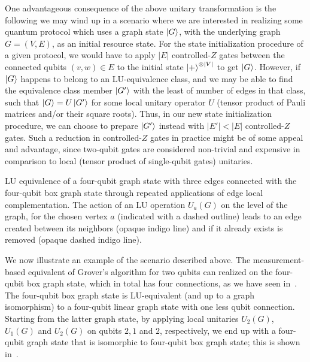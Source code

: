 \bigskip
\noindent
One advantageous consequence of the above unitary transformation is the following we may wind up in a scenario where we are interested in realizing some quantum protocol which uses a graph state $\ket{G}$, with the underlying graph $G=(V,E)$, as an initial resource state. For the state initialization procedure of a given protocol, we would have to apply $|E|$ controlled-$Z$ gates between the connected qubits $(v,w) \in E$ to the initial state $\ket{+}^{\otimes |V|}$ to get $\ket{G}$. However, if $\ket{G}$ happens to belong to an \acs{LU}-equivalence class, and we may be able to find the equivalence class member $\ket{G'}$ with the least of number of edges in that class, such that $\ket{G} = U\ket{G'}$ for some local unitary operator $U$ (tensor product of Pauli matrices and/or their square roots). Thus, in our new state initialization procedure, we can choose to prepare $\ket{G'}$ instead with $|E'| < |E|$ controlled-$Z$ gates. Such a reduction in controlled-$Z$ gates in practice might be of some appeal and advantage, since two-qubit gates are considered non-trivial and expensive in comparison to local (tensor product of single-qubit gates) unitaries.

\begin{marginfigure}
	\centering
    \caption[\acs{LU} equivalence of a four-qubit graph state with three edges with the four-qubit box graph state through repeated applications of edge local complementation.]{\acs{LU} equivalence of a four-qubit graph state with three edges connected with the four-qubit box graph state through repeated applications of edge local complementation. The action of an \acs{LU} operation $U_a(G)$ on the level of the graph, for the chosen vertex $a$ (indicated with a dashed outline) leads to an edge created between its neighbors (opaque indigo line) and if it already exists is removed (opaque dashed indigo line).}
\end{marginfigure}

\bigskip
\noindent
We now illustrate an example of the scenario described above. The measurement-based equivalent of Grover's algorithm for two qubits can realized on the four-qubit box graph state, which in total has four connections, as we have seen in~. The four-qubit box graph state is \acs{LU}-equivalent (and up to a graph isomorphism) to a four-qubit linear graph state with one less qubit connection. Starting from the latter graph state, by applying local unitaries $U_2(G)$, $U_1(G)$ and $U_2(G)$ on qubits $2, 1$ and $2$, respectively, we end up with a four-qubit graph state that is isomorphic to four-qubit box graph state; this is shown in~.

